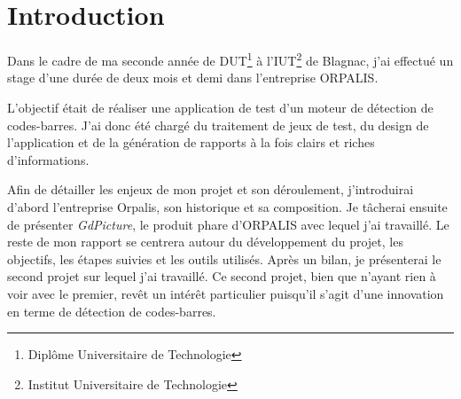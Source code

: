 \chapter*{Introduction}

Dans le cadre de ma seconde année de DUT\footnote{Diplôme Universitaire de Technologie} à l'IUT\footnote{Institut Universitaire de Technologie} de Blagnac, j'ai effectué un stage d'une durée de deux mois et demi dans l'entreprise ORPALIS.

L'objectif était de réaliser une application de test d'un moteur de détection de codes-barres. J'ai donc été chargé du traitement de jeux de test, du design de l'application et de la génération de rapports à la fois clairs et riches d'informations.

Afin de détailler les enjeux de mon projet et son déroulement, j'introduirai d'abord l'entreprise Orpalis, son historique et sa composition. Je tâcherai ensuite de présenter \emph{GdPicture}, le produit phare d'ORPALIS avec lequel j'ai travaillé. Le reste de mon rapport se centrera autour du développement du projet, les objectifs, les étapes suivies et les outils utilisés. Après un bilan, je présenterai le second projet sur lequel j'ai travaillé. Ce second projet, bien que n'ayant rien à voir avec le premier, revêt un intérêt particulier puisqu'il s'agit d'une innovation en terme de détection de codes-barres.